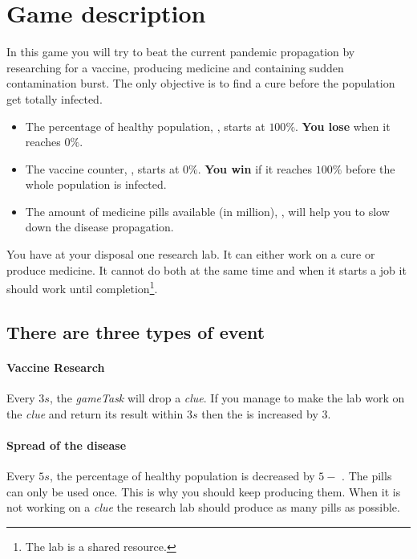 \section*{Game description}

In this game you will try to beat the current pandemic propagation by researching for a vaccine, producing medicine and containing sudden contamination burst.
The only objective is to find a cure before the population get totally infected.
\begin{itemize}
	\item The percentage of healthy population, , starts at $ 100\% $. \textbf{You lose} when it reaches $ 0\% $.
	\item The vaccine counter, , starts at $ 0\% $. \textbf{You win} if it reaches $ 100\% $ before the whole population is infected.
	\item The amount of medicine pills available (in million), , will help you to slow down the disease propagation.
\end{itemize}

You have at your disposal one research lab.
It can either work on a cure or produce medicine.
It cannot do both at the same time and when it starts a job it should work until completion\footnote{The lab is a shared resource.}.


\subsection*{There are three types of event}

\paragraph{Vaccine Research}
Every $ 3s $, the \textit{gameTask} will drop a \textit{clue}.
If you manage to make the lab work on the \textit{clue} and return its result within $ 3s $ then the  is increased by $ 3 $.

\paragraph{Spread of the disease}
Every $ 5s $, the percentage of healthy population is decreased by $ 5 - $ .
The pills can only be used once.
This is why you should keep producing them.
When it is not working on a \textit{clue} the research lab should produce as many pills as possible.

